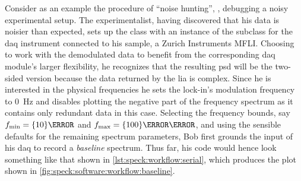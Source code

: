 Consider as an example the procedure of \enquote{noise hunting}, \ie, debugging a noisy experimental setup.
The experimentalist,
having discovered that his data is noisier than expected, sets up the  class with an instance of the  subclass for the \gls{daq} instrument connected to his sample, a Zurich Instruments MFLI.
Choosing to work with the demodulated data to benefit from the corresponding \acrshort{daq} module's larger flexibility, he recognizes that the resulting \gls{psd} will be the two-sided version because the data returned by the \gls{lia} is complex.
Since he is interested in the physical frequencies
he sets the lock-in's modulation frequency to \qty{0}{\hertz} and disables plotting the negative part of the frequency spectrum as it contains only redundant data in this case.
Selecting the frequency bounds, say $\fmin = \qty{10}{\hertz}$ and $\fmax = \qty{100}{\kilo\hertz}$, and using the sensible defaults for the remaining spectrum parameters, Bob first grounds the input of his \gls{daq} to record a \emph{baseline} spectrum.
Thus far, his code would hence look something like that shown in \cref{lst:speck:workflow:serial}, which produces the plot shown in \cref{fig:speck:software:workflow:baseline}.

